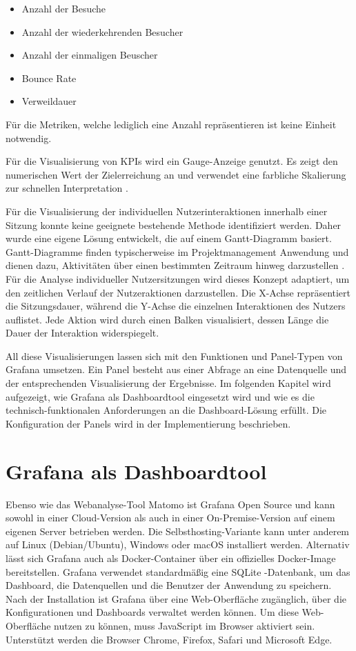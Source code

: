 \begin{itemize}
    \item \glqq Anzahl der Besuche\grqq{}
    \item \glqq Anzahl der wiederkehrenden Besucher\grqq{}
    \item \glqq Anzahl der einmaligen Beuscher\grqq{}
    \item \glqq Bounce Rate\grqq{}
    \item \glqq Verweildauer\grqq{}
\end{itemize}

Für die Metriken, welche lediglich eine Anzahl repräsentieren ist keine Einheit notwendig.

Für die Visualisierung von KPIs wird ein Gauge-Anzeige genutzt. Es zeigt den numerischen Wert der Zielerreichung an und verwendet eine farbliche Skalierung zur schnellen Interpretation \parencite{GrafanaGauge}.

Für die Visualisierung der individuellen Nutzerinteraktionen innerhalb einer Sitzung konnte keine geeignete bestehende Methode identifiziert werden. Daher wurde eine eigene Lösung entwickelt, die auf einem Gantt-Diagramm basiert. Gantt-Diagramme finden typischerweise im Projektmanagement Anwendung und dienen dazu, Aktivitäten über einen bestimmten Zeitraum hinweg darzustellen \parencite{GanttCom}. Für die Analyse individueller Nutzersitzungen wird dieses Konzept adaptiert, um den zeitlichen Verlauf der Nutzeraktionen darzustellen. Die X-Achse repräsentiert die Sitzungsdauer, während die Y-Achse die einzelnen Interaktionen des Nutzers auflistet. Jede Aktion wird durch einen Balken visualisiert, dessen Länge die Dauer der Interaktion widerspiegelt.

All diese Visualisierungen lassen sich mit den Funktionen und Panel-Typen von Grafana umsetzen. Ein Panel besteht aus einer Abfrage an eine Datenquelle und der entsprechenden Visualisierung der Ergebnisse. Im folgenden Kapitel wird aufgezeigt, wie Grafana als Dashboardtool eingesetzt wird und wie es die technisch-funktionalen Anforderungen an die Dashboard-Lösung erfüllt. Die Konfiguration der Panels wird in der Implementierung beschrieben. 

\section{Grafana als Dashboardtool}
Ebenso wie das Webanalyse-Tool Matomo ist Grafana Open Source und kann sowohl in einer Cloud-Version als auch in einer On-Premise-Version auf einem eigenen Server betrieben werden. Die Selbsthosting-Variante kann unter anderem auf Linux (Debian/Ubuntu), Windows oder macOS installiert werden. Alternativ lässt sich Grafana auch als Docker-Container über ein offizielles Docker-Image bereitstellen. Grafana verwendet standardmäßig eine SQLite -Datenbank, um das Dashboard, die Datenquellen und die Benutzer der Anwendung zu speichern. Nach der Installation ist Grafana über eine Web-Oberfläche zugänglich, über die Konfigurationen und Dashboards verwaltet werden können. Um diese Web-Oberfläche nutzen zu können, muss JavaScript im Browser aktiviert sein. Unterstützt werden die Browser Chrome, Firefox, Safari und Microsoft Edge. \parencite{GrafanaLabsInstall}

